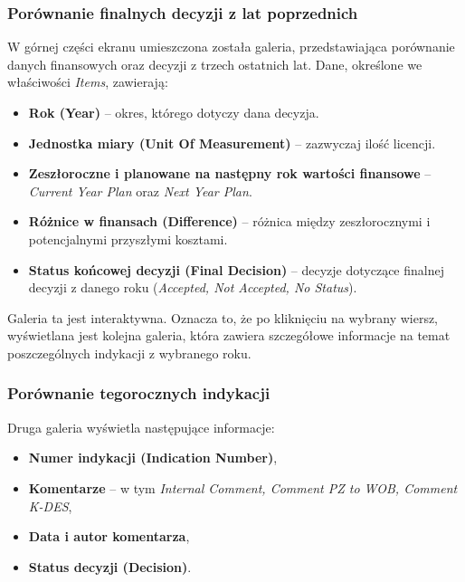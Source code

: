 \subsubsection*{Porównanie finalnych decyzji z lat poprzednich}

W górnej części ekranu umieszczona została galeria, przedstawiająca porównanie danych finansowych oraz decyzji z trzech ostatnich lat. Dane, określone we właściwości \emph{Items}, zawierają:

\begin{itemize}
    \item \textbf{Rok (Year)} -- okres, którego dotyczy dana decyzja.
    \item \textbf{Jednostka miary (Unit Of Measurement)} -- zazwyczaj ilość licencji.
    \item \textbf{Zeszłoroczne i planowane na następny rok wartości finansowe} -- \emph{Current Year Plan} oraz \emph{Next Year Plan}.
    \item \textbf{Różnice w finansach (Difference)} -- różnica między zeszłorocznymi i potencjalnymi przyszłymi kosztami.
    \item \textbf{Status końcowej decyzji (Final Decision)} -- decyzje dotyczące finalnej decyzji z danego roku (\emph{Accepted, Not Accepted, No Status}).
\end{itemize}




Galeria ta jest interaktywna. Oznacza to, że po kliknięciu na wybrany wiersz, wyświetlana jest kolejna galeria, która zawiera szczegółowe informacje na temat poszczególnych indykacji z wybranego roku.

\subsubsection*{Porównanie tegorocznych indykacji}

Druga galeria wyświetla następujące informacje:
\begin{itemize}
    \item \textbf{Numer indykacji (Indication Number)},
    \item \textbf{Komentarze} -- w tym \emph{Internal Comment, Comment PZ to WOB, Comment K-DES},
    \item \textbf{Data i autor komentarza},
    \item \textbf{Status decyzji (Decision)}.
\end{itemize}

